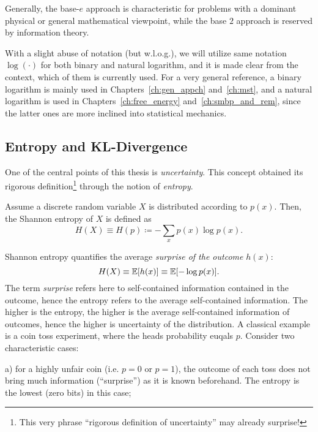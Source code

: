 Generally, the base-$e$ approach is characteristic for problems with a
dominant physical or general mathematical viewpoint, while the base $2$ approach
is reserved by information theory.

With a slight abuse of notation (but w.l.o.g.), we will utilize same notation
$\log(\cdot)$ for both binary and natural logarithm, and it is made clear from
the context, which of them is currently used. For a very general reference, a
binary logarithm is mainly used in Chapters~\ref{ch:gen_appch} and~\ref{ch:mst},
and a natural logarithm is used in 
Chapters~\ref{ch:free_energy} and~\ref{ch:smbp_and_rem}, since the latter ones 
are more inclined into statistical mechanics.

\subsection{Entropy and KL-Divergence}
One of the central points of this thesis is \textit{uncertainty}. This concept
obtained its rigorous definition\footnote{This very phrase ``rigorous definition
of uncertainty'' may already surprise!} through the notion of \textit{entropy}.
\begin{definition}\label{def:shannon_entropy}
  Assume a discrete random variable $X$ is distributed according to $p(x)$. Then,
  the Shannon entropy of $X$ is defined as
  \begin{equation}
    H(X) \equiv H(p) \coloneqq -\sum_{x} p(x) \log p(x).
  \end{equation}
\end{definition}
%
Shannon entropy quantifies the average \textit{surprise of the outcome} $h(x)$:
\begin{equation}
  H(X) \equiv \mathbb{E}[h(x)] \equiv \mathbb{E}[ - \log p(x)].
\end{equation} 
The term \textit{surprise} refers here to self-contained information contained
in the outcome, hence the entropy refers to the average self-contained
information. The higher is the entropy, the higher is the average self-contained
information of outcomes, hence the higher is uncertainty of the distribution. A
classical example is a coin toss experiment, where the heads probability 
euqals $p$. Consider two characteristic cases: 

a) for a highly unfair coin (i.e. $p = 0$ or $p = 1$), the outcome of each 
toss does not bring much information (``surprise'') as it is known beforehand. The entropy
is the lowest (zero bits) in this case; 

